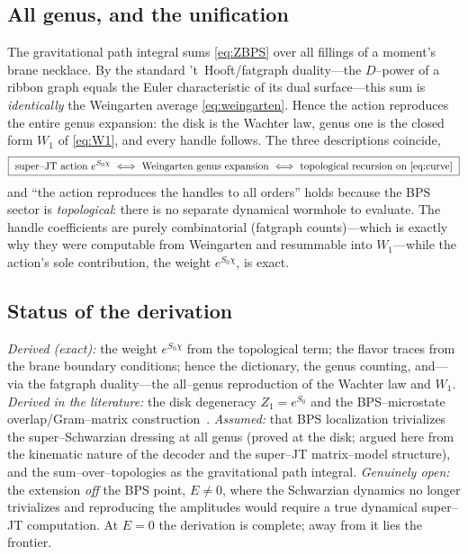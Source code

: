 \documentclass[11pt]{article}
\newif\ifpedagogical
\newcommand{\ped}[1]{\ifpedagogical\par\smallskip{\small\color{pedcol}%
  \leftskip=1.4em\rightskip=1.4em\noindent$\triangleright$~\textit{Plain-language aside.}~#1\par}%
  \par\smallskip\fi}
\begin{document}
\subsection{All genus, and the unification}
The gravitational path integral sums \eqref{eq:ZBPS} over all fillings of a moment's brane necklace.
By the standard 't~Hooft/fatgraph duality---the $D$--power of a ribbon graph equals the Euler
characteristic of its dual surface---this sum is \emph{identically} the Weingarten average
\eqref{eq:weingarten}.
\ped{This is the hinge of the whole argument. On the matrix side (Weingarten), each diagram comes with a
power of $D$; on the gravity side, each surface comes with $e^{S_0\chi}=D^{\chi}$. 't~Hooft's 1974
observation is that these are the \emph{same} number---the power of $D$ from the index loops of a
fattened diagram equals the Euler characteristic of the surface you get by filling the diagram in.
So ``sum over random--matrix diagrams'' and ``sum over 2d surfaces'' are two names for one sum, and
the genus expansion of the moments \emph{is} the gravitational sum over topologies.} Hence the action reproduces the entire genus expansion: the disk is the
Wachter law, genus one is the closed form $W_1$ of \eqref{eq:W1}, and every handle follows. The three
descriptions coincide,
\begin{equation}
  \boxed{\ \text{super--JT action }e^{S_0\chi}\ \Longleftrightarrow\
  \text{Weingarten genus expansion}\ \Longleftrightarrow\
  \text{topological recursion on \eqref{eq:curve}}\ }
\end{equation}
and ``the action reproduces the handles to all orders'' holds because the BPS sector is
\emph{topological}: there is no separate dynamical wormhole to evaluate. The handle coefficients are
purely combinatorial (fatgraph counts)---which is exactly why they were computable from Weingarten
and resummable into $W_1$---while the action's sole contribution, the weight $e^{S_0\chi}$, is exact.

\subsection*{Status of the derivation}
\emph{Derived (exact):} the weight $e^{S_0\chi}$ from the topological term; the flavor traces from
the brane boundary conditions; hence the dictionary, the genus counting, and---via the fatgraph
duality---the all--genus reproduction of the Wachter law and $W_1$. \emph{Derived in the
literature:} the disk degeneracy $Z_1=e^{S_0}$ and the BPS--microstate overlap/Gram--matrix
construction~\cite{HITZ,BPSmicro,N2matrix}. \emph{Assumed:} that BPS localization trivializes the
super--Schwarzian dressing at all genus (proved at the disk; argued here from the kinematic nature of
the decoder and the super--JT matrix--model structure), and the sum--over--topologies as the
gravitational path integral. \emph{Genuinely open:} the extension \emph{off} the BPS point, $E\neq0$,
where the Schwarzian dynamics no longer trivializes and reproducing the amplitudes would require a
true dynamical super--JT computation. At $E=0$ the derivation is complete; away from it lies the
frontier.
\end{document}
